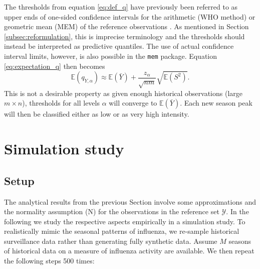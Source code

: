 \documentclass[12pt]{article}
\begin{document}
The thresholds from equation \eqref{eq:def_q} have previously been referred to as upper ends of one-sided confidence intervals for the arithmetic (WHO method) or geometric mean (MEM) of the reference observations \citep{WHO2014, Vega2015}. As mentioned in Section \ref{subsec:reformulation}, this is imprecise terminology and the thresholds should instead be interpreted as predictive quantiles. The use of actual confidence interval limits, however, is also possible in the \texttt{mem} package. Equation \eqref{eq:expectation_q} then becomes
$$
\mathbb{E}(q_{Y, \alpha}) \approx \mathbb{E}(\bar{Y}) + \frac{z_\alpha}{\sqrt{nm}} \sqrt{\mathbb{E}(S^2)}.
$$
This is not a desirable property as given enough historical observations (large $m \times n$), thresholds for all levels $\alpha$ will converge to $\mathbb{E}(\bar{Y})$. Each new season peak will then be classified either as low or as very high intensity. %

\section{Simulation study}
\label{sec:simulation}

\subsection{Setup}
\label{subsec:simulation_setup}

The analytical results from the previous Section involve some approximations and the normality assumption (N) for the observations in the reference set $\mathcal{Y}$. In the following we study the respective aspects empirically in a simulation study. To realistically mimic the seasonal patterns of influenza, we re-sample historical surveillance data rather than generating fully synthetic data. Assume $M$ seasons of historical data on a measure of influenza activity are available. We then repeat the following steps 500 times:
\end{document}
